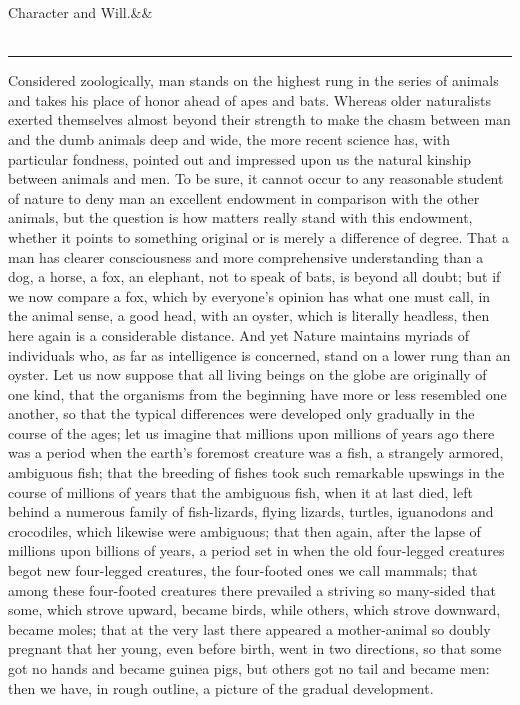 \documentclass[12pt,a4paper,openany]{book}
\newcommand{\opage}[1]{\marginnote{\footnotesize\textit{[#1]}}}
\newcommand{\essayhead}[2]{\begin{center}{\large #1}\ifx&#2&\else\\[0.3em]{\normalsize #2}\fi\\[0.5em]\rule{3em}{0.4pt}\end{center}\medskip\noindent}
\begin{document}
\essayhead{Character and Will.}{}
\setcounter{footnote}{0}%
\opage{489}Considered zoologically, man stands on the highest rung
in the series of animals and takes his place of honor ahead of
apes and bats. Whereas older naturalists exerted themselves almost
beyond their strength to make the chasm between
man and the dumb animals deep and wide, the more recent
science has, with particular fondness, pointed out and impressed upon us the
natural kinship between animals and men. To be sure,
it cannot occur to any reasonable student of nature to
deny man an excellent endowment in comparison
with the other animals, but the question is how matters
really stand with this endowment, whether it points
to something original or is merely a difference of degree. That
a man has clearer consciousness and more comprehensive
understanding than a dog, a horse, a fox, an elephant, not
to speak of bats, is beyond all doubt; but
if we now compare a fox, which by everyone's opinion has
what one must call, in the animal sense, a good head,
with an oyster, which is literally headless, then here
again is a considerable distance. And yet Nature maintains
myriads of individuals who, as far as intelligence is concerned,
stand on a lower rung than an oyster. Let us now suppose that
\setcounter{footnote}{0}%
\opage{490}all living beings on the globe are originally of
one kind, that the organisms from the beginning have more or less
resembled one another, so that the typical differences
were developed only gradually in the course of the ages;
let us imagine that millions upon millions of
years ago there was a period when the earth's foremost
creature was a fish, a strangely armored, ambiguous
fish; that the breeding of fishes took such remarkable
upswings in the course of millions of years that the ambiguous fish, when it at last
died, left behind a numerous family of fish-lizards, flying lizards,
turtles, iguanodons and crocodiles, which likewise
were ambiguous; that then again, after the lapse of
millions upon billions of years, a period set in when
the old four-legged creatures begot new four-legged creatures, the four-footed ones we
call mammals; that among these four-footed creatures there prevailed a
striving so many-sided that some, which strove upward, became
birds, while others, which strove downward, became moles;
that at the very last there appeared a mother-animal so
doubly pregnant that her young, even before birth,
went in two directions, so that some got no hands
and became guinea pigs, but others got no tail and became
men: then we have, in rough outline, a picture of
the gradual development.
\end{document}
